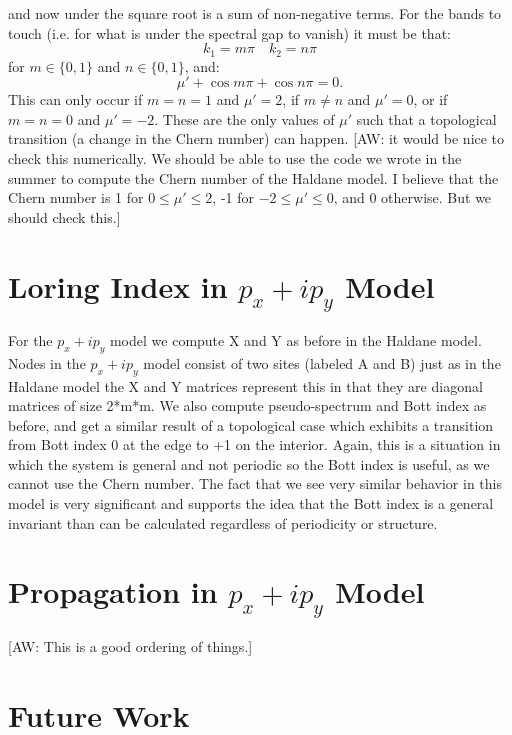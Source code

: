 \documentclass[a4paper]{article}
\newcommand{\aw}[1]{{\color{blue} [AW: #1]}}
\begin{document}
and now under the square root is a sum of non-negative terms. For the bands to touch (i.e. for what is under the spectral gap to vanish) it must be that:
\begin{equation}
	k_1 = m \pi \quad k_2 = n \pi
\end{equation}
for $m \in \{0,1\}$ and $n \in \{0,1\}$, and:
\begin{equation}
	\mu' + \cos m \pi + \cos n \pi = 0.
\end{equation}
This can only occur if $m = n = 1$ and $\mu' = 2$, if $m \neq n$ and $\mu' = 0$, or if $m = n = 0$ and $\mu' = - 2$. These are the only values of $\mu'$ such that a topological transition (a change in the Chern number) can happen. \aw{it would be nice to check this numerically. We should be able to use the code we wrote in the summer to compute the Chern number of the Haldane model. I believe that the Chern number is 1 for $0 \leq \mu' \leq 2$, -1 for $- 2 \leq \mu' \leq 0$, and 0 otherwise. But we should check this.}

\section{Loring Index in \texorpdfstring{$p_x + ip_y$}{px + ipy} Model}
For the \texorpdfstring{$p_x + ip_y$}{px + ipy} model we compute X and Y as before in the Haldane model. Nodes in the \texorpdfstring{$p_x + ip_y$}{px + ipy} model consist of two sites (labeled A and B) just as in the Haldane model the X and Y matrices represent this in that they are diagonal matrices of size 2*m*m. We also compute pseudo-spectrum and Bott index as before, and get a similar result of a topological case which exhibits a transition from Bott index 0 at the edge to +1 on the interior. Again, this is a situation in which the system is general and not periodic so the Bott index is useful, as we cannot use the Chern number. The fact that we see very similar behavior in this model is very significant and supports the idea that the Bott index is a general invariant than can be calculated regardless of periodicity or structure.
\section{Propagation in \texorpdfstring{$p_x + ip_y$}{px + ipy} Model}
\aw{This is a good ordering of things.}

\section{Future Work}
\end{document}
